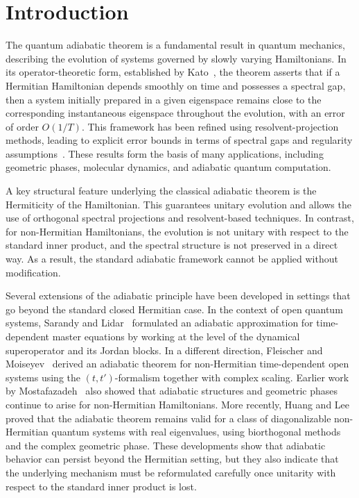 \documentclass[pdflatex,sn-mathphys-num]{sn-jnl}
\theoremstyle{thmstyleone}
\theoremstyle{thmstyletwo}
\theoremstyle{thmstylethree}
\begin{document}
\section{Introduction}\label{sec1}

The quantum adiabatic theorem is a fundamental result in quantum mechanics, describing the evolution of systems governed by slowly varying Hamiltonians. In its operator-theoretic form, established by Kato~\cite{Kato1950}, the theorem asserts that if a Hermitian Hamiltonian depends smoothly on time and possesses a spectral gap, then a system initially prepared in a given eigenspace remains close to the corresponding instantaneous eigenspace throughout the evolution, with an error of order $O(1/T)$. This framework has been refined using resolvent-projection methods, leading to explicit error bounds in terms of spectral gaps and regularity assumptions~\cite{Avron1987,Jansen2007,Scherer2019}. These results form the basis of many applications, including geometric phases, molecular dynamics, and adiabatic quantum computation.

A key structural feature underlying the classical adiabatic theorem is the Hermiticity of the Hamiltonian. This guarantees unitary evolution and allows the use of orthogonal spectral projections and resolvent-based techniques. In contrast, for non-Hermitian Hamiltonians, the evolution is not unitary with respect to the standard inner product, and the spectral structure is not preserved in a direct way. As a result, the standard adiabatic framework cannot be applied without modification.

Several extensions of the adiabatic principle have been developed in settings that go beyond the standard closed Hermitian case. In the context of open quantum systems, Sarandy and Lidar~\cite{SarandyLidar2005} formulated an adiabatic approximation for time-dependent master equations by working at the level of the dynamical superoperator and its Jordan blocks. In a different direction, Fleischer and Moiseyev~\cite{FleischerMoiseyev2005} derived an adiabatic theorem for non-Hermitian time-dependent open systems using the $(t,t')$-formalism together with complex scaling. Earlier work by Mostafazadeh~\cite{Mostafazadeh1999} also showed that adiabatic structures and geometric phases continue to arise for non-Hermitian Hamiltonians. More recently, Huang and Lee~\cite{HuangLee2025} proved that the adiabatic theorem remains valid for a class of diagonalizable non-Hermitian quantum systems with real eigenvalues, using biorthogonal methods and the complex geometric phase. These developments show that adiabatic behavior can persist beyond the Hermitian setting, but they also indicate that the underlying mechanism must be reformulated carefully once unitarity with respect to the standard inner product is lost.
\end{document}
